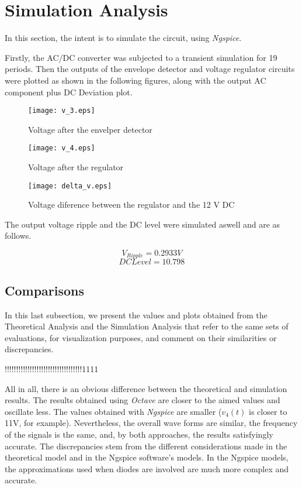 \section{Simulation Analysis}
\label{sec:simulation}

In this section, the intent is to simulate the circuit, using \textit{Ngspice}.

Firstly, the AC/DC converter was subjected to a transient simulation for 19 periods. Then the outputs of the envelope detector and voltage regulator circuits were plotted as shown in the following figures, along with the output AC component plus DC Deviation plot.

\begin{figure}[h]
\centering
\caption{Voltage after the envelper detector}
\texttt{[image: v\_3.eps]}
\label{plot5}
\end{figure}

\begin{figure}[h]
\centering
\caption{Voltage after the regulator}
\texttt{[image: v\_4.eps]}
\label{plot6}
\end{figure}

\begin{figure}[h]
\centering
\caption{Voltage diference between the regulator and the 12 V DC}
\texttt{[image: delta\_v.eps]}
\label{plot7}
\end{figure}

The output voltage ripple and the DC level were simulated aswell and are as follows.

\begin{equation}
    V_{Ripple} = 0.2933 V
\end{equation}
\begin{equation}
    DC Level = 10.798
\end{equation}


\subsection{Comparisons}
\label{subsec:compare}

In this last subsection, we present the values and plots obtained from the Theoretical Analysis and the Simulation Analysis that refer to the same sets of evaluations, for visualization purposes, and comment on their similarities or discrepancies.

!!!!!!!!!!!!!!!!!!!!!!!!!!!!!!!!!!1111


All in all, there is an obvious difference between the theoretical and simulation results. The results obtained using \textit{Octave} are closer to the aimed values and oscillate less. The values obtained with \textit{Ngspice} are smaller ($v_4(t)$ is closer to 11V, for example). Nevertheless, the overall wave forms are similar, the frequency of the signals is the same, and, by both approaches, the results satisfyingly accurate. 
The discrepancies stem from the different considerations made in the theoretical model and in the Ngspice software's models. In the Ngspice models, the approximations used when diodes are involved are much more complex and accurate.
